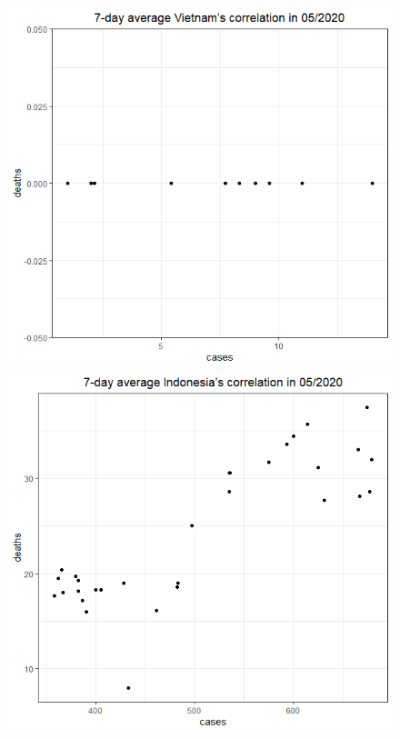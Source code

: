 \documentclass[english,10pt,table]{beamer}
\begin{document}
{\begin{figure}[H]
\begin{center}
        \includegraphics[scale = 0.2]{ix/ix.3/VN_05_2020.png}
        \includegraphics[scale = 0.2]{ix/ix.3/IDN_05_2020.png}

\end{center}
\end{figure}}
\end{document}
